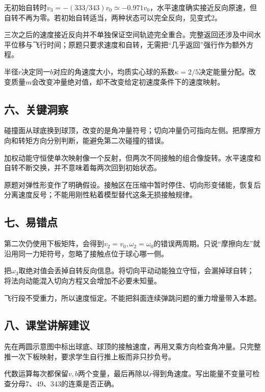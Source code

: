 \documentclass[12pt,a4paper,fontset=fandol]{ctexart}
\begin{document}
无初始自转时\(v_3=-(333/343)v_0\simeq-0.971v_0\)，水平速度确实接近反向原速，但自转不再为零。若初始自转适当，两种状态可以完全反向，见变式2。

三次之后的速度接近反向并不单独保证空间轨迹完全重合。完整返回还涉及中间水平位移与飞行时间；原题只要求速度和自转，无需把``几乎返回''强行作为额外方程。

半径\(r\)决定同一\(b\)对应的角速度大小，均质实心球的系数\(\kappa=2/5\)决定能量分配。改变质量\(m\)会改变冲量绝对值，却不改变给定初速度条件下的速度映射。

\subsection{六、关键洞察}\label{ux516dux5173ux952eux6d1eux5bdf-2}

碰撞面从球底换到球顶，改变的是角冲量符号；切向冲量仍可指向左侧。把摩擦方向和转矩方向分别判断，能避免第二次碰撞的错误。

加权动能守恒使单次映射像一个反射，但两次不同接触的组合像旋转。水平速度和自转不断交换，并不意味着每两次回到初始状态。

原题对弹性形变作了明确假设。接触区在压缩中暂时停住、切向形变储能，恢复后分离速度反号；不能用刚性粘着模型替代这条无损接触规律。

\subsection{七、易错点}\label{ux4e03ux6613ux9519ux70b9-2}

第二次仍使用下板矩阵，会得到\(v_2=v_0,\omega_2=\omega_0\)的错误两周期。只说``摩擦向左''就沿用同一力矩符号，忽略了接触点位于球心哪一侧。

把\(\omega_3\)取绝对值会丢掉自转反向信息。将切向平动动能独立守恒，会漏掉球自转；将法向动能混入切向方程又会增加不必要未知量。

飞行段不受重力，所以速度恒定。不能把斜面连续弹跳问题的重力增量带入本题。

\subsection{八、课堂讲解建议}\label{ux516bux8bfeux5802ux8bb2ux89e3ux5efaux8bae-2}

先在两圆示意图中标出球底、球顶的接触速度，再用叉乘方向检查角冲量。只完整推一次下板映射，要求学生自行推上板而非只抄负号。

代数运算每次都保留\(v,b\)两个变量，最后再除以\(r\)得到角速度。写出能量不变量可检查分母7、49、343的连乘是否正确。
\end{document}
